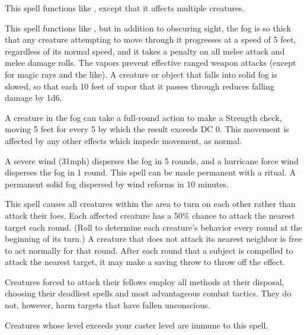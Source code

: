 \begin{spelleffect}
  This spell functions like , except that it affects multiple creatures.
\end{spelleffect}

\spelldur{\durmed}
\begin{spelleffect}
  This spell functions like , but in addition to obscuring sight, the fog is so thick that any creature attempting to move through it progresses at a speed of 5 feet, regardless of its normal speed, and it takes a  penalty on all melee attack and melee damage rolls. The vapors prevent effective ranged weapon attacks (except for magic rays and the like). A creature or object that falls into solid fog is slowed, so that each 10 feet of vapor that it passes through reduces falling damage by 1d6.
  \par A creature in the fog can take a full-round action to make a Strength check, moving 5 feet for every 5 by which the result exceeds DC 0. This movement is affected by any other effects which impede movement, as normal.
\end{spelleffect}
\begin{spellnotes}
  A severe wind (31\add mph) disperses the fog in 5 rounds, and a hurricane force wind disperses the fog in 1 round. This spell can be made permanent with a  ritual. A permanent solid fog dispersed by wind reforms in 10 minutes.
\end{spellnotes}

\spelldur{\durshort}
\begin{spelleffect}
  This spell causes all creatures within the area to turn on each other rather than attack their foes. Each affected creature has a 50\% chance to attack the nearest target each round. (Roll to determine each creature's behavior every round at the beginning of its turn.) A creature that does not attack its nearest neighbor is free to act normally for that round. After each round that a subject is compelled to attack the nearest target, it may make a saving throw to throw off the effect.
  \par Creatures forced to attack their fellows employ all methods at their disposal, choosing their deadliest spells and most advantageous combat tactics. They do not, however, harm targets that have fallen unconscious.
\end{spelleffect}
\begin{spellnotes}
    Creatures whose level exceeds your caster level are immune to this spell.
\end{spellnotes}

